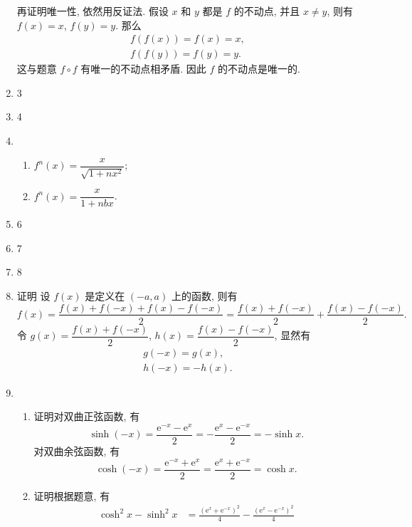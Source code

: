 \documentclass[12pt]{article}
\begin{document}
\begin{enumerate}
        再证明唯一性, 依然用反证法. 假设 $x$ 和 $y$ 都是 $f$ 的不动点, 并且 $x \neq y$, 则有 $f(x) = x$, $f(y) = y$.
        那么
        \begin{gather*}
            f(f(x)) = f(x) = x, \\
            f(f(y)) = f(y) = y.
        \end{gather*}
        这与题意 $f \circ f$ 有唯一的不动点相矛盾. 因此 $f$ 的不动点是唯一的.
    \item 3
    \item 4
    \item %
        \begin{enumerate}[(1)]
            \item %
                $f^n(x) = \dfrac{x}{\sqrt{1 + nx^2}}$;
            \item %
                $f^n(x) = \dfrac{x}{1 + nbx}$.
        \end{enumerate}
    \item 6
    \item 7
    \item 8
    \item %
        {\heiti 证明} 设 $f(x)$ 是定义在 $(-a, a)$ 上的函数, 则有
        \[
            f(x) = \frac{f(x) + f(-x) + f(x) - f(-x)}{2} = \frac{f(x) + f(-x)}{2} + \frac{f(x) - f(-x)}{2}.    
        \]
        令 $g(x) = \dfrac{f(x) + f(-x)}{2}$, $h(x) = \dfrac{f(x) - f(-x)}{2}$, 显然有
        \begin{gather*}
            g(-x) = g(x), \\
            h(-x) = -h(x).
        \end{gather*}
    \item %
        \begin{enumerate}[(1)]
            \item %
                {\heiti 证明}\quad 对双曲正弦函数, 有
                \[
                    \sinh(-x) = \frac{\mathrm{e}^{-x} - \mathrm{e}^x}{2} = -\frac{\mathrm{e}^x - \mathrm{e}^{-x}}{2} = -\sinh x.    
                \]
                对双曲余弦函数, 有
                \[
                    \cosh(-x) = \frac{\mathrm{e}^{-x} + \mathrm{e}^x}{2} = \frac{\mathrm{e}^x + \mathrm{e}^{-x}}{2} = \cosh x.     
                \]
            \item %
                {\heiti 证明}\quad 根据题意, 有
                \begin{align*}
                    \cosh^2x - \sinh^2x &= \frac{(\mathrm{e}^x + \mathrm{e}^{-x})^2}{4} - \frac{(\mathrm{e}^x - \mathrm{e}^{-x})^2}{4} \\

\end{align*}
\end{enumerate}
\end{enumerate}
\end{document}
